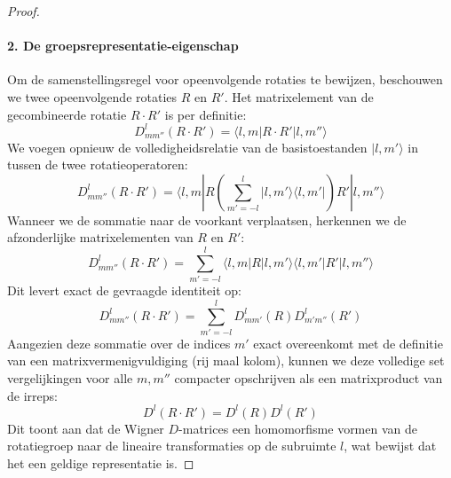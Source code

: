 \begin{proof}
    \paragraph{2. De groepsrepresentatie-eigenschap}
    Om de samenstellingsregel voor opeenvolgende rotaties te bewijzen, beschouwen we twee opeenvolgende rotaties $R$ en $R'$. Het matrixelement van de gecombineerde rotatie $R \cdot R'$ is per definitie:
    \[
    D^l_{m m''} (R \cdot R') = \langle l, m | R \cdot R' | l, m'' \rangle
    \]
    We voegen opnieuw de volledigheidsrelatie van de basistoestanden $|l, m'\rangle$ in tussen de twee rotatieoperatoren:
    \[
    D^l_{m m''} (R \cdot R') = \langle l, m | R \left( \sum_{m'=-l}^l |l, m'\rangle \langle l, m'| \right) R' | l, m'' \rangle
    \]
    Wanneer we de sommatie naar de voorkant verplaatsen, herkennen we de afzonderlijke matrixelementen van $R$ en $R'$:
    \[
    D^l_{m m''} (R \cdot R') = \sum_{m'=-l}^l \langle l, m | R | l, m'\rangle \langle l, m' | R' | l, m'' \rangle
    \]
    Dit levert exact de gevraagde identiteit op:
    \[
    D^l_{m m''} (R \cdot R') = \sum_{m'=-l}^{l} D^l_{mm'} (R)D^l_{m'm''} (R')
    \]
    Aangezien deze sommatie over de indices $m'$ exact overeenkomt met de definitie van een matrixvermenigvuldiging (rij maal kolom), kunnen we deze volledige set vergelijkingen voor alle $m, m''$ compacter opschrijven als een matrixproduct van de irreps:
    \[
    D^l(R \cdot R') = D^l(R)D^l(R')
    \]
    Dit toont aan dat de Wigner $D$-matrices een homomorfisme vormen van de rotatiegroep naar de lineaire transformaties op de subruimte $l$, wat bewijst dat het een geldige representatie is.
\end{proof}